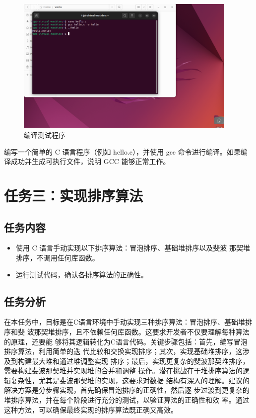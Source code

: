 \documentclass[UTF8]{ctexart}
\begin{document}
\begin{figure}[H]
    \centering
    \includegraphics[width=0.95\textwidth]{picture/Screenshot 2024-10-14 203120.png}
    \caption{编译测试程序}
\end{figure}
编写一个简单的 C 语言程序（例如 hello.c），并使用 gcc 命令进行编译。如果编译成功并生成可执行文件，说明 GCC 能够正常工作。

\section{任务三：实现排序算法}
\subsection{任务内容}
\begin{itemize}
    \item 使用 C 语言手动实现以下排序算法：冒泡排序、基础堆排序以及斐波
    那契堆排序，不调用任何库函数。
    \item 运行测试代码，确认各排序算法的正确性。
\end{itemize}

\subsection{任务分析}
在本任务中，目标是在C语言环境中手动实现三种排序算法：冒泡排序、基础堆排序和斐
波那契堆排序，且不依赖任何库函数。这要求开发者不仅要理解每种算法的原理，还要能
够将其逻辑转化为C语言代码。关键步骤包括：首先，编写冒泡排序算法，利用简单的迭
代比较和交换实现排序；其次，实现基础堆排序，这涉及到构建最大堆和通过堆调整实现
排序；最后，实现更复杂的斐波那契堆排序，需要构建斐波那契堆并实现堆的合并和调整
操作。潜在挑战在于堆排序算法的逻辑复杂性，尤其是斐波那契堆的实现，这要求对数据
结构有深入的理解。建议的解决方案是分步骤实现，首先确保冒泡排序的正确性，然后逐
步过渡到更复杂的堆排序算法，并在每个阶段进行充分的测试，以验证算法的正确性和效
率。通过这种方法，可以确保最终实现的排序算法既正确又高效。
\end{document}
